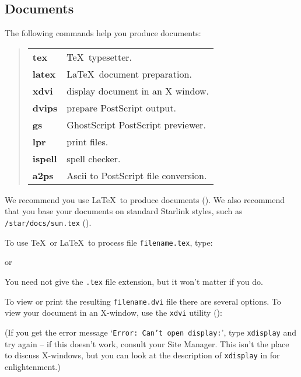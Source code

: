 \documentclass[twoside,11pt,nolof]{starlink}
\begin{document}
\subsection{Documents}
The following commands help you produce documents:
\begin{quote}
\begin{tabular}{lp{67mm}}

\textbf{tex}   & \TeX\ typesetter.\\
\textbf{latex} & \LaTeX\ document preparation.\\
\textbf{xdvi}  & display document in an X window.\\
\textbf{dvips} & prepare PostScript output.\\
\textbf{gs}    & GhostScript PostScript previewer.\\
\textbf{lpr}   & print files.\\
\textbf{ispell} & spell checker.\\
\textbf{a2ps} & Ascii to PostScript file conversion.

\end{tabular}
\end{quote}
We recommend you use \LaTeX\ to produce documents
().
We also recommend that you base your documents on standard Starlink styles,
such as \texttt{/star/docs/sun.tex}
().

To use \TeX\ or \LaTeX\ to process file \texttt{filename.tex}, type:
\begin{terminalv}
\end{terminalv}
or
\begin{terminalv}
\end{terminalv}
You need not give the \texttt{.tex} file extension, but it won't matter if you
do.

To view or print the resulting \texttt{filename.dvi} file there are several
options.
To view your document in an X-window, use the \texttt{xdvi} utility
():
\begin{terminalv}
\end{terminalv}
(If you get the error message `\texttt{Error: Can't open display:}', type
\texttt{xdisplay} and try again -- if this doesn't work, consult your Site
Manager.
This isn't the place to discuss X-windows, but you can look at the description
of \texttt{xdisplay} in
 for enlightenment.)
\end{document}
